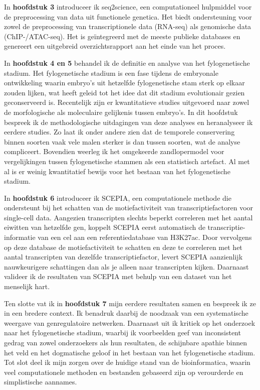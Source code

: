 In \textbf{hoofdstuk 3} introduceer ik seq2science, een computationeel hulpmiddel voor de preprocessing van data uit functionele genetica. Het biedt ondersteuning voor zowel de preprocessing van transcriptionele data (RNA-seq) als genomische data (ChIP-/ATAC-seq). Het is geïntegreerd met de meeste publieke databases en genereert een uitgebreid overzichtsrapport aan het einde van het proces.

In \textbf{hoofdstuk 4 en 5} behandel ik de definitie en analyse van het fylogenetische stadium. Het fylogenetische stadium is een fase tijdens de embryonale ontwikkeling waarin embryo's uit hetzelfde fylogenetische stam sterk op elkaar zouden lijken, wat heeft geleid tot het idee dat dit stadium evolutionair gezien geconserveerd is. Recentelijk zijn er kwantitatieve studies uitgevoerd naar zowel de morfologische als moleculaire gelijkenis tussen embryo's. In dit hoofdstuk bespreek ik de methodologische uitdagingen van deze analyses en heranalyseer ik eerdere studies. Zo laat ik onder andere zien dat de temporele conservering binnen soorten vaak vele malen sterker is dan tussen soorten, wat de analyse compliceert. Bovendien weerleg ik het omgekeerde zandlopermodel voor vergelijkingen tussen fylogenetische stammen als een statistisch artefact. Al met al is er weinig kwantitatief bewijs voor het bestaan van het fylogenetische stadium.

In \textbf{hoofdstuk 6} introduceer ik SCEPIA, een computationele methode die ondersteunt bij het schatten van de motiefactiviteit van transcriptiefactoren voor single-cell data. Aangezien transcripten slechts beperkt correleren met het aantal eiwitten van hetzelfde gen, koppelt SCEPIA eerst automatisch de transcriptie-informatie van een cel aan een referentiedatabase van H3K27ac. Door vervolgens op deze database de motiefactiviteit te schatten en deze te correleren met het aantal transcripten van dezelfde transcriptiefactor, levert SCEPIA aanzienlijk nauwkeurigere schattingen dan als je alleen naar transcripten kijken. Daarnaast valideer ik de resultaten van SCEPIA met behulp van een dataset van het menselijk hart.

Ten slotte vat ik in \textbf{hoofdstuk 7} mijn eerdere resultaten samen en bespreek ik ze in een bredere context. Ik benadruk daarbij de noodzaak van een systematische weergave van genregulatoire netwerken. Daarnaast uit ik kritiek op het onderzoek naar het fylogenetische stadium, waarbij ik voorbeelden geef van inconsistent gedrag van zowel onderzoekers als hun resultaten, de schijnbare apathie binnen het veld en het dogmatische geloof in het bestaan van het fylogenetische stadium. Tot slot deel ik mijn zorgen over de huidige stand van de bioinformatica, waarin veel computationele methoden en bestanden gebaseerd zijn op verourderde en simplistische aannames.

